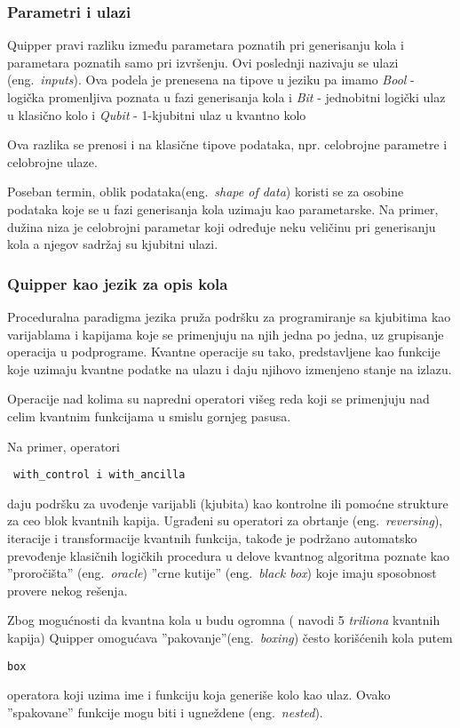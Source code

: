 \documentclass[a4paper]{article}
\begin{document}
{\subsubsection{Parametri i ulazi}

Quipper pravi razliku između parametara poznatih pri generisanju kola i parametara poznatih samo pri izvršenju. Ovi poslednji nazivaju se ulazi (eng.~\emph{inputs}). Ova podela je prenesena na tipove u jeziku pa imamo \emph{Bool} - logička promenljiva poznata u fazi generisanja kola i \emph{Bit} - jednobitni logički ulaz u klasično kolo i \emph{Qubit} - 1-kjubitni ulaz u kvantno kolo

Ova razlika se prenosi i na klasične tipove podataka, npr. celobrojne parametre i celobrojne ulaze.

Poseban termin, oblik podataka(eng.~\emph{shape of data}) koristi se za osobine podataka koje se u fazi generisanja kola uzimaju kao parametarske. Na primer, dužina niza je celobrojni parametar koji određuje neku veličinu pri generisanju kola a njegov sadržaj su kjubitni ulazi.

\subsubsection{Quipper kao jezik za opis kola}

Proceduralna paradigma jezika pruža podršku za programiranje sa kjubitima kao varijablama i kapijama koje se primenjuju na njih jedna po jedna, uz grupisanje operacija u podprograme. Kvantne operacije su tako, predstavljene kao funkcije koje uzimaju kvantne podatke na ulazu i daju njihovo izmenjeno stanje na izlazu.

Operacije nad kolima su napredni operatori višeg reda koji se primenjuju nad celim kvantnim funkcijama u smislu gornjeg pasusa.

Na primer, operatori \begin{verbatim} with_control i with_ancilla \end{verbatim} daju podršku za uvođenje varijabli (kjubita) kao kontrolne ili pomoćne strukture za ceo blok kvantnih kapija. Ugrađeni su operatori za obrtanje (eng.~\emph{reversing}), iteracije i transformacije kvantnih funkcija, takođe je podržano automatsko prevođenje klasičnih logičkih procedura u  delove kvantnog algoritma poznate kao ''proročišta'' (eng.~\emph{oracle}) ''crne kutije'' (eng.~\emph{black box}) koje imaju sposobnost provere nekog rešenja.

Zbog mogućnosti da kvantna kola u budu ogromna (\cite{quipper_language} navodi 5 \emph{triliona} kvantnih kapija) Quipper omogućava ''pakovanje''(eng.~\emph{boxing}) često korišćenih kola putem \begin{verbatim}
box
\end{verbatim} operatora koji uzima ime i funkciju koja generiše kolo kao ulaz. Ovako ''spakovane'' funkcije mogu biti i ugneždene (eng.~\emph{nested}).


}
\end{document}
